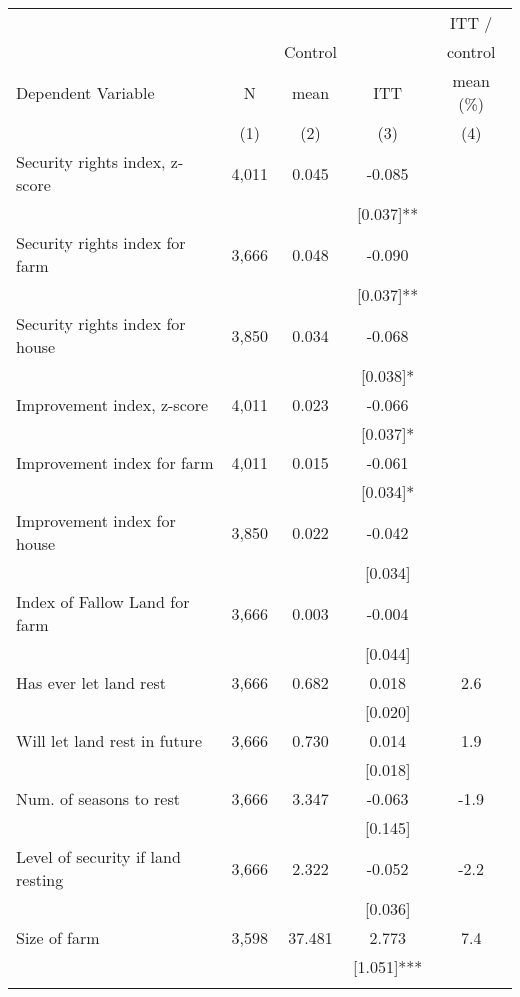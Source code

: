 \begin{tabular}{lcccc}
\hline \noalign{\smallskip} &  &  &  & ITT /\\
 &  & Control &  & control\\
Dependent Variable & N & mean & ITT & mean (\%)\\
 & (1) & (2) & (3) & (4)\\
\noalign{\smallskip}\hline \noalign{\smallskip}Security rights index, z-score & 4,011 & 0.045 & -0.085 & \\
 &  &  & [0.037]** & \\
\quad Security rights index for farm & 3,666 & 0.048 & -0.090 & \\
 &  &  & [0.037]** & \\
\quad Security rights index for house & 3,850 & 0.034 & -0.068 & \\
 &  &  & [0.038]* & \\
Improvement index, z-score & 4,011 & 0.023 & -0.066 & \\
 &  &  & [0.037]* & \\
\quad Improvement index for farm & 4,011 & 0.015 & -0.061 & \\
 &  &  & [0.034]* & \\
\quad Improvement index for house & 3,850 & 0.022 & -0.042 & \\
 &  &  & [0.034] & \\
Index of Fallow Land for farm & 3,666 & 0.003 & -0.004 & \\
 &  &  & [0.044] & \\
\quad Has ever let land rest & 3,666 & 0.682 & 0.018 & 2.6\\
 &  &  & [0.020] & \\
\quad Will let land rest in future & 3,666 & 0.730 & 0.014 & 1.9\\
 &  &  & [0.018] & \\
\quad Num. of seasons to rest & 3,666 & 3.347 & -0.063 & -1.9\\
 &  &  & [0.145] & \\
\quad Level of security if land resting & 3,666 & 2.322 & -0.052 & -2.2\\
 &  &  & [0.036] & \\
Size of farm & 3,598 & 37.481 & 2.773 & 7.4\\
 &  &  & [1.051]*** & \\
\noalign{\smallskip}\hline\end{tabular}
